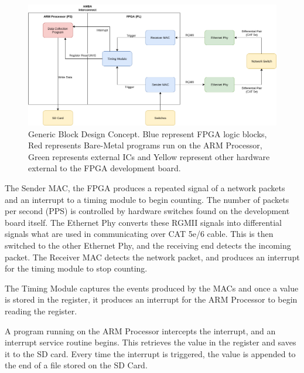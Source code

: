 \begin{figure}[H]
    \begin{center}
        \includegraphics[keepaspectratio,width=15cm]{Images/BlockDesignConcept}
        \caption{Generic Block Design Concept. Blue represent FPGA logic blocks, Red represents Bare-Metal programs run on the ARM Processor, Green represents external ICs and Yellow represent other hardware external to the FPGA development board.}
        \label{fig:blockdesignconcept}
    \end{center}
\end{figure}

\vspace{-3mm}

\par The Sender MAC, the FPGA produces a repeated signal of a network packets and an interrupt to a timing module to 
begin counting. The number of packets per second (PPS) is controlled by hardware switches found on the development 
board itself. The Ethernet Phy converts these RGMII signals into differential signals what are used in communicating 
over CAT 5e/6 cable. This is then switched to the other Ethernet Phy, and the receiving end detects the incoming 
packet. The Receiver MAC detects the network packet, and produces an interrupt for the timing module to stop counting.

\par The Timing Module captures the events produced by the MACs and once a value is stored in the register, it 
produces an interrupt for the ARM Processor to begin reading the register. 

\par A program running on the ARM Processor intercepts the interrupt, and an interrupt service routine begins. This 
retrieves the value in the register and saves it to the SD card. Every time the interrupt is triggered, the value is 
appended to the end of a file stored on the SD Card. 

